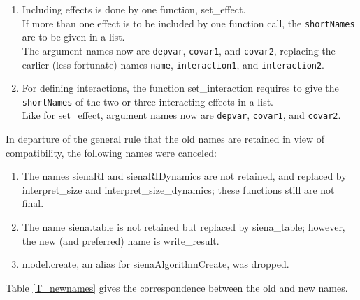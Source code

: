\documentclass[a4paper,fleqn,11pt]{article}
\newcommand{\+}{\, + \,}
\newcommand{\sfn}[1]{\textsf{#1}}
\begin{document}
\begin{enumerate}
        \sfn{as\_covariate\_rsiena}; the distinction between monadic and dyadic,
        and between changing or time-constant, is made by the
        structure of the input object and the further arguments
        (see the table below).
  \item Including effects is done by one function, \sfn{set\_effect}.\\
        If more than one effect is to be included by one function call,
        the \texttt{shortNames} are to be given in a list.\\
        The argument names now are \texttt{depvar}, \texttt{covar1},
        and \texttt{covar2}, replacing the earlier (less fortunate)
        names \texttt{name}, \texttt{interaction1}, and \texttt{interaction2}.
  \item For defining interactions, the function \sfn{set\_interaction}
        requires to give the \texttt{shortNames} of the two or three
        interacting effects in a list.\\
        Like for \sfn{set\_effect}, argument names now are
        \texttt{depvar}, \texttt{covar1}, and \texttt{covar2}.
\end{enumerate}

In departure of the general rule that the old names are retained
in view of compatibility, the following names were canceled:
\begin{enumerate}[resume]
  \item The names \sfn{sienaRI} and \sfn{sienaRIDynamics}
        are not retained, and replaced by \sfn{interpret\_size} and
        \sfn{interpret\_size\_dynamics}; these functions still are not
        final.
  \item The name \sfn{siena.table} is not retained but replaced
         by  \sfn{siena\_table};
         however, the new (and preferred) name is \sfn{write\_result}.
  \item \sfn{model.create}, an alias for \sfn{sienaAlgorithmCreate},
        was dropped.
\end{enumerate}

\noindent
Table \ref{T_newnames} gives the correspondence between the old and new names.
\bigskip
\end{document}

